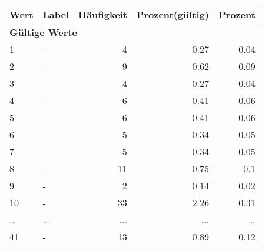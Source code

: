      \begin{longtable}{lXrrr}
     \toprule
     \textbf{Wert} & \textbf{Label} & \textbf{Häufigkeit} & \textbf{Prozent(gültig)} & \textbf{Prozent} \\
     \endhead
     \midrule
     \multicolumn{5}{l}{\textbf{Gültige Werte}}\\
        1 & \multicolumn{1}{X}{-} & %
          \num{4} &
          \num[round-mode=places,round-precision=2]{0.27} &
          \num[round-mode=places,round-precision=2]{0.04} \\
        2 & \multicolumn{1}{X}{-} & %
          \num{9} &
          \num[round-mode=places,round-precision=2]{0.62} &
          \num[round-mode=places,round-precision=2]{0.09} \\
        3 & \multicolumn{1}{X}{-} & %
          \num{4} &
          \num[round-mode=places,round-precision=2]{0.27} &
          \num[round-mode=places,round-precision=2]{0.04} \\
        4 & \multicolumn{1}{X}{-} & %
          \num{6} &
          \num[round-mode=places,round-precision=2]{0.41} &
          \num[round-mode=places,round-precision=2]{0.06} \\
        5 & \multicolumn{1}{X}{-} & %
          \num{6} &
          \num[round-mode=places,round-precision=2]{0.41} &
          \num[round-mode=places,round-precision=2]{0.06} \\
        6 & \multicolumn{1}{X}{-} & %
          \num{5} &
          \num[round-mode=places,round-precision=2]{0.34} &
          \num[round-mode=places,round-precision=2]{0.05} \\
        7 & \multicolumn{1}{X}{-} & %
          \num{5} &
          \num[round-mode=places,round-precision=2]{0.34} &
          \num[round-mode=places,round-precision=2]{0.05} \\
        8 & \multicolumn{1}{X}{-} & %
          \num{11} &
          \num[round-mode=places,round-precision=2]{0.75} &
          \num[round-mode=places,round-precision=2]{0.1} \\
        9 & \multicolumn{1}{X}{-} & %
          \num{2} &
          \num[round-mode=places,round-precision=2]{0.14} &
          \num[round-mode=places,round-precision=2]{0.02} \\
        10 & \multicolumn{1}{X}{-} & %
          \num{33} &
          \num[round-mode=places,round-precision=2]{2.26} &
          \num[round-mode=places,round-precision=2]{0.31} \\
       ... & ... & ... & ... & ... \\
        41 & \multicolumn{1}{X}{-} & %
          \num{13} &
          \num[round-mode=places,round-precision=2]{0.89} &
          \num[round-mode=places,round-precision=2]{0.12} \\


\end{longtable}
